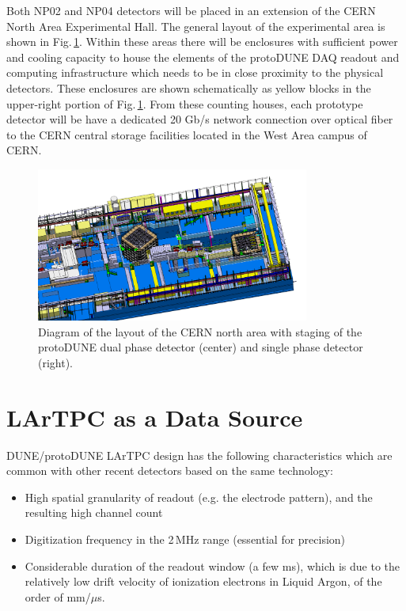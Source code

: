 \documentclass[a4paper]{jpconf}
\newcommand{\pd}{protoDUNE\xspace}
\begin{document}
Both NP02 and NP04 detectors will be placed in an extension of the CERN North Area Experimental Hall.
The general layout of the experimental area is shown in Fig.\,\ref{fig:np02np04}.
Within these areas there will be enclosures with sufficient power and cooling capacity to house
the elements of the \pd DAQ readout and computing infrastructure which
needs to be in close proximity to the physical detectors.
These enclosures are shown schematically as yellow blocks in the
upper-right portion of Fig.\,\ref{fig:np02np04}. From these counting
houses, each prototype detector will be have a dedicated 20 Gb/s
network connection over optical fiber to the CERN central storage
facilities located in the West Area campus of CERN.  

\begin{figure}[tb]
\centering\includegraphics[width=0.8\textwidth]{figures/np02np04.png}
\caption{\label{fig:np02np04}Diagram of the layout of the CERN north area with
  staging of the protoDUNE dual phase detector (center) and single
  phase detector (right).}
\end{figure}

\section{LArTPC as a Data Source}

DUNE/\pd LArTPC design has the following characteristics which are common with
other recent detectors based on the same technology:
\begin{itemize}
\item High spatial granularity of readout (e.g. the electrode pattern), and the resulting high channel count
\item Digitization frequency in the 2\,MHz range (essential for precision)
\item Considerable duration of the readout window (a few ms), which is due to the relatively
low drift velocity of ionization electrons in Liquid Argon, of the order of mm/$\mu$s.
\end{itemize}
\end{document}
